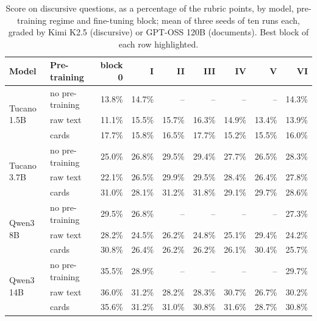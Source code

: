 \documentclass{IOS-Book-Article}
\begin{document}
\begin{table}[!ht]
\centering
\caption{Score on discursive questions, as a percentage of the rubric points, by model, pre-training regime and fine-tuning block; mean of three seeds of ten runs each, graded by Kimi K2.5 (discursive) or GPT-OSS 120B (documents). Best block of each row highlighted.}
\footnotesize\setlength{\tabcolsep}{3pt}
\begin{tabular}{llrrrrrrr}
\hline
\textbf{Model} & \textbf{Pre-training} & \textbf{block 0} & \textbf{I} & \textbf{II} & \textbf{III} & \textbf{IV} & \textbf{V} & \textbf{VI} \\
\hline
\multirow{3}{*}{Tucano 1.5B} & no pre-training & 13.8\% & 14.7\% & -- & -- & -- & -- & 14.3\% \\
 & raw text & 11.1\% & 15.5\% & 15.7\% & 16.3\% & 14.9\% & 13.4\% & 13.9\% \\
 & cards & 17.7\% & 15.8\% & 16.5\% & 17.7\% & 15.2\% & 15.5\% & 16.0\% \\
\multirow{3}{*}{Tucano 3.7B} & no pre-training & 25.0\% & 26.8\% & 29.5\% & 29.4\% & 27.7\% & 26.5\% & 28.3\% \\
 & raw text & 22.1\% & 26.5\% & 29.9\% & 29.5\% & 28.4\% & 26.4\% & 27.8\% \\
 & cards & 31.0\% & 28.1\% & 31.2\% & 31.8\% & 29.1\% & 29.7\% & 28.6\% \\
\multirow{3}{*}{Qwen3 8B} & no pre-training & 29.5\% & 26.8\% & -- & -- & -- & -- & 27.3\% \\
 & raw text & 28.2\% & 24.5\% & 26.2\% & 24.8\% & 25.1\% & 29.4\% & 24.2\% \\
 & cards & 30.8\% & 26.4\% & 26.2\% & 26.2\% & 26.1\% & 30.4\% & 25.7\% \\
\multirow{3}{*}{Qwen3 14B} & no pre-training & 35.5\% & 28.9\% & -- & -- & -- & -- & 29.7\% \\
 & raw text & 36.0\% & 31.2\% & 28.2\% & 28.3\% & 30.7\% & 26.7\% & 30.2\% \\
 & cards & 35.6\% & 31.2\% & 31.0\% & 30.8\% & 31.6\% & 28.7\% & 30.8\% \\
\hline
\end{tabular}
\end{table}
\end{document}
